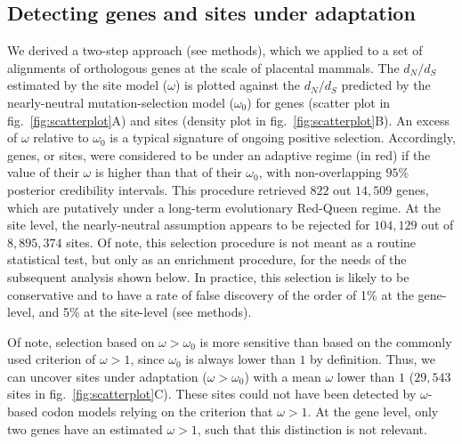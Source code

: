 \documentclass{article}
\newcommand{\dn}{d_N}
\newcommand{\ds}{d_S}
\newcommand{\dnds}{\dn / \ds}
\begin{document}
    \subsection*{Detecting genes and sites under adaptation}
    We derived a two-step approach (see methods), which we applied to a set of alignments of orthologous genes at the scale of placental mammals.
    The $\dnds$ estimated by the site model ($\omega$) is plotted against the $\dnds$ predicted by the nearly-neutral mutation-selection model ($\omega_{0}$) for genes (scatter plot in fig.~\ref{fig:scatterplot}A) and sites (density plot in fig.~\ref{fig:scatterplot}B).
    An excess of $\omega$ relative to $\omega_{0}$ is a typical signature of ongoing positive selection\cite{bloom_identification_2017, rodrigue_detecting_2017}.
    Accordingly, genes, or sites, were considered to be under an adaptive regime (in red) if the value of their $\omega$ is higher than that of their $\omega_{0}$, with non-overlapping $95\%$ posterior credibility intervals.
    This procedure retrieved $822$ out $14,509$ genes, which are putatively under a long-term evolutionary Red-Queen regime.
    At the site level, the nearly-neutral assumption appears to be rejected for $104,129$ out of $8,895,374$ sites.
    Of note, this selection procedure is not meant as a routine statistical test, but only as an enrichment procedure, for the needs of the subsequent analysis shown below.
    In practice, this selection is likely to be conservative and to have a rate of false discovery of the order of 1\% at the gene-level, and 5\% at the site-level (see methods).

    Of note, selection based on $\omega>\omega_{0}$ is more sensitive than based on the commonly used criterion of $\omega>1$, since $\omega_{0}$ is always lower than $1$ by definition\cite{spielman_relationship_2015}.
    Thus, we can uncover sites under adaptation ($\omega>\omega_{0}$) with a mean $\omega$ lower than $1$ ($29,543$ sites in fig.~\ref{fig:scatterplot}C).
    These sites could not have been detected by $\omega$-based codon models relying on the criterion that $\omega>1$.
    At the gene level, only two genes have an estimated $\omega > 1$, such that this distinction is not relevant.
\end{document}
